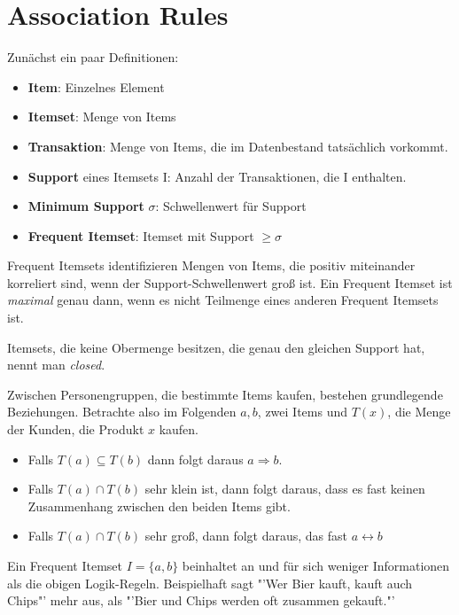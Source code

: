 \section{Association Rules}
Zunächst ein paar Definitionen:

\begin{itemize}
	\item \textbf{Item}: Einzelnes Element
	\item \textbf{Itemset}: Menge von Items
	\item \textbf{Transaktion}: Menge von Items, die im Datenbestand
		tatsächlich vorkommt.
	\item \textbf{Support} eines Itemsets I: Anzahl der Transaktionen, die
		I enthalten.
	\item \textbf{Minimum Support} \(\sigma\): Schwellenwert für Support
	\item \textbf{Frequent Itemset}: Itemset mit Support \(\geq\sigma\)
\end{itemize}

Frequent Itemsets identifizieren Mengen von Items, die positiv miteinander 
korreliert sind, wenn der Support-Schwellenwert groß ist. Ein Frequent Itemset
ist \textit{maximal} genau dann, wenn es nicht Teilmenge eines anderen 
Frequent Itemsets ist.

Itemsets, die keine Obermenge besitzen, die genau den gleichen Support hat, 
nennt man \textit{closed}.

Zwischen Personengruppen, die bestimmte Items kaufen, bestehen grundlegende
Beziehungen. Betrachte also im Folgenden \(a,b\), zwei Items und \(T(x)\), 
die Menge der Kunden, die Produkt \(x\) kaufen.
\begin{itemize}
	\item Falls \(T(a) \subseteq T(b)\) dann folgt daraus \(a \Rightarrow b\).
	\item Falls \(T(a) \cap T(b)\) sehr klein ist, dann folgt daraus, dass es
		fast keinen Zusammenhang zwischen den beiden Items gibt.
	\item Falls \(T(a) \cap T(b)\) sehr groß, dann folgt daraus, das fast 
		\(a \leftrightarrow b\)
\end{itemize}

Ein Frequent Itemset \(I=\{a,b\}\) beinhaltet an und für sich weniger Informationen
als die obigen Logik-Regeln.
Beispielhaft sagt "'Wer Bier kauft, kauft auch Chips"' mehr aus, als "'Bier und Chips
werden oft zusammen gekauft."' 

